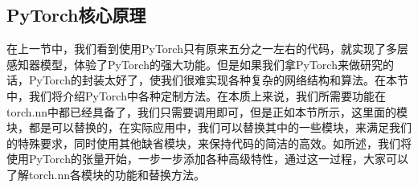\documentclass[UTF8]{article}
\begin{document}
\subsection{PyTorch核心原理}
在上一节中，我们看到使用PyTorch只有原来五分之一左右的代码，就实现了多层感知器模型，体验了PyTorch的强大功能。但是如果我们拿PyTorch来做研究的话，PyTorch的封装太好了，使我们很难实现各种复杂的网络结构和算法。在本节中，我们将介绍PyTorch中各种定制方法。在本质上来说，我们所需要功能在torch.nn中都已经具备了，我们只需要调用即可，但是正如本节所示，这里面的模块，都是可以替换的，在实际应用中，我们可以替换其中的一些模块，来满足我们的特殊要求，同时使用其他缺省模块，来保持代码的简洁的高效。如\cite{pytorch-nn-in-detail1}所述，我们将使用PyTorch的张量开始，一步一步添加各种高级特性，通过这一过程，大家可以了解torch.nn各模块的功能和替换方法。 \newline
\end{document}
